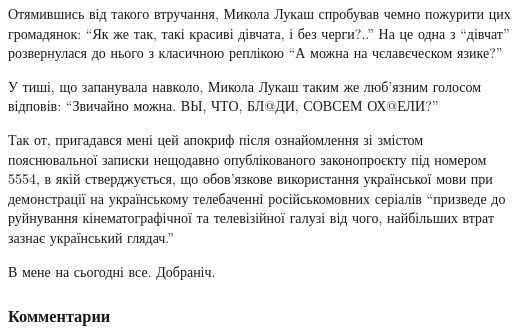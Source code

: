 Отямившись від такого втручання, Микола Лукаш спробував чемно пожурити цих
громадянок: \enquote{Як же так, такі красиві дівчата, і без черги?..} На це
одна з \enquote{дівчат} розвернулася до нього з класичною реплікою \enquote{А
можна на чєлавєческом язике?}

У тиші, що запанувала навколо, Микола Лукаш таким же люб'язним голосом
відповів: \enquote{Звичайно можна. ВЫ, ЧТО, БЛ@ДИ, СОВСЕМ ОХ@ЕЛИ?}

Так от, пригадався мені цей апокриф після ознайомлення зі змістом пояснювальної
записки нещодавно опублікованого законопроєкту під номером 5554, в якій
стверджується, що обов'язкове використання української мови при демонстрації на
українському телебаченні російськомовних серіалів \enquote{призведе до руйнування
кінематографічної та телевізійної галузі від чого, найбільших втрат зазнає
український глядач.}

В мене на сьогодні все. Добраніч.

\subsubsection{Комментарии}

